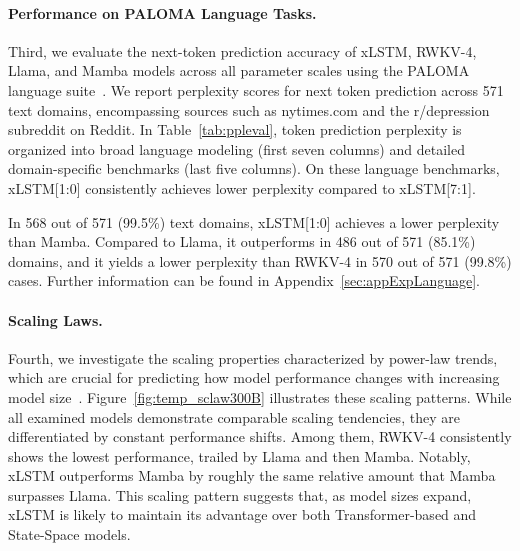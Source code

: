 \paragraph{Performance on PALOMA Language Tasks.} Third, we evaluate the next-token prediction accuracy of xLSTM, RWKV-4, Llama, and Mamba models across all parameter scales using the PALOMA language suite~\citep{Magnusson:23arxivshort}. We report perplexity scores for next token prediction across 571 text domains, encompassing sources such as nytimes.com and the r/depression subreddit on Reddit. In Table~\ref{tab:ppleval}, token prediction perplexity is organized into broad language modeling (first seven columns) and detailed domain-specific benchmarks (last five columns). On these language benchmarks, xLSTM[1:0] consistently achieves lower perplexity compared to xLSTM[7:1].

In 568 out of 571 (99.5\%) text domains, xLSTM[1:0] achieves a lower perplexity than Mamba. Compared to Llama, it outperforms in 486 out of 571 (85.1\%) domains, and it yields a lower perplexity than RWKV-4 in 570 out of 571 (99.8\%) cases. Further information can be found in Appendix~\ref{sec:appExpLanguage}.

\paragraph{Scaling Laws.} Fourth, we investigate the scaling properties characterized by power-law trends, which are crucial for predicting how model performance changes with increasing model size~\citep{Kaplan:20,Brown:20short}. Figure~\ref{fig:temp_sclaw300B} illustrates these scaling patterns. While all examined models demonstrate comparable scaling tendencies, they are differentiated by constant performance shifts. Among them, RWKV-4 consistently shows the lowest performance, trailed by Llama and then Mamba. Notably, xLSTM outperforms Mamba by roughly the same relative amount that Mamba surpasses Llama. This scaling pattern suggests that, as model sizes expand, xLSTM is likely to maintain its advantage over both Transformer-based and State-Space models.

